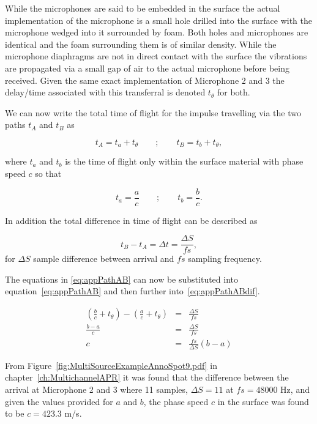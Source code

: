 While the microphones are said to be embedded in the surface the actual implementation of the microphone is a small hole drilled into the surface with the microphone wedged into it surrounded by foam. Both holes and microphones are identical and the foam surrounding them is of similar density. While the microphone diaphragms are not in direct contact with the surface the vibrations are propagated via a small gap of air to the actual microphone before being received. Given the same exact implementation of Microphone 2 and 3 the delay/time associated with this transferral is denoted $t_\theta$ for both.

We can now write the total time of flight for the impulse travelling via the two paths $t_A$ and $t_B$ as

\begin{equation}\label{eq:appPathAB}
t_A = t_a + t_\theta \qquad ; \qquad t_B = t_b + t_\theta,
\end{equation}

where $t_a$ and $t_b$ is the time of flight only within the surface material with phase speed $c$ so that

\begin{equation}\label{eq:appPathABSpeed}
t_a = \frac{a}{c} \qquad ; \qquad t_b = \frac{b}{c}.
\end{equation}

In addition the total difference in time of flight can be described as 

\begin{equation}\label{eq:appPathABdif}
t_B - t_A = \Delta t = \frac{\Delta S}{fs},
\end{equation}
for $\Delta S$ sample difference between arrival and $fs$ sampling frequency.

The equations in \ref{eq:appPathAB} can now be substituted into equation~\ref{eq:appPathAB} and then further into~\ref{eq:appPathABdif}.

\begin{eqnarray}
\nonumber   \left(\frac{b}{c} + t_\theta\right) - \left(\frac{a}{c} + t_\theta\right) &=& \frac{\Delta S}{fs} \\
\nonumber   \frac{b-a}{c} &=& \frac{\Delta S}{fs} \\
            c &=& \frac{fs}{\Delta S} \left( b-a \right)
\end{eqnarray}

From Figure~\ref{fig:MultiSourceExampleAnnoSpot9.pdf} in chapter~\ref{ch:MultichannelAPR} it was found that the difference between the arrival at Microphone 2 and 3 where 11 samples, $\Delta S = 11$ at $fs = 48000$ Hz, and given the values provided for $a$ and $b$, the phase speed $c$ in the surface was found to be $c = 423.3 $ m/s.



